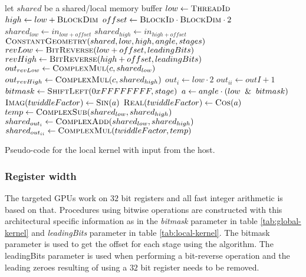 \begin{algorithm}
	\centering
	\begin{algorithmic}[1]
            \State let $shared$ be a shared/local memory buffer     
            \State $low  \gets \Call{ThreadId}{}$
            \State $high \gets low + \Call{BlockDim}{}$   
            \State $offset \gets \Call{BlockId}{} \cdot \Call{BlockDim}{} \cdot 2$
            \State $shared_{low}  \gets in_{low + offset}$
            \State $shared_{high} \gets in_{high + offset}$
            \State $\Call{ConstantGeometry}{shared, low, high, angle, stages}$
            \State $revLow  \gets \Call{BitReverse}{low + offset, leadingBits}$
            \State $revHigh \gets \Call{BitReverse}{high + offset, leadingBits}$
            \State $out_{revLow}  \gets \Call{ComplexMul}{c, shared_{low}}$
            \State $out_{revHigh} \gets \Call{ComplexMul}{c, shared_{high}}$
        \EndProcedure
        \Statex
            \State $out_{i} \gets low \cdot 2$
            \State $out_{ii} \gets outI + 1$
            	\State $bitmask \gets \Call{ShiftLeft}{0xFFFFFFFF, stage}$
            	\State $a \gets angle \cdot (low \And bitmask)$
            	\State $\Call{Imag}{twiddleFactor} \gets \Call{Sin}{a}$
            	\State $\Call{Real}{twiddleFactor} \gets \Call{Cos}{a}$
				\State $temp \gets \Call{ComplexSub}{shared_{low}, shared_{high}}$
				\State $shared_{out_{i}} \gets \Call{ComplexAdd}{shared_{low}, shared_{high}}$
				\State $shared_{out_{ii}} \gets \Call{ComplexMul}{twiddleFactor, temp}$
			\EndFor
        \EndProcedure
	\end{algorithmic}
	\caption{Pseudo-code for the local kernel with input from the host.}
	\label{alg:device:local-kernel}
\end{algorithm}

\subsubsection{Register width}

The targeted \gls{GPU}s work on $32$ bit registers and all fast integer arithmetic is based on that. Procedures using bitwise operations are constructed with this architectural specific information as in the \emph{bitmask} parameter in table \ref{tab:global-kernel} and \emph{leadingBits} parameter in table \ref{tab:local-kernel}. The bitmask parameter is used to get the offset for each stage using the {\CTALG} algorithm. The leadingBits parameter is used when performing a bit-reverse operation and the leading zeroes resulting of using a $32$ bit register needs to be removed.

